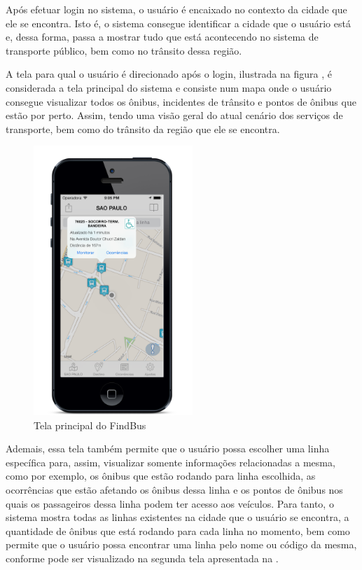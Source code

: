 Após efetuar login no sistema, o usuário é encaixado no contexto da cidade que ele se encontra. Isto é, o sistema consegue identificar a cidade que o usuário está e, dessa forma,  passa a mostrar tudo que está acontecendo no sistema de transporte público, bem como no trânsito dessa região. 
	
A tela para qual o usuário é direcionado após o login, ilustrada na figura , é considerada a tela principal do sistema e consiste num mapa onde o usuário consegue visualizar todos os ônibus, incidentes de trânsito e pontos de ônibus que estão por perto. Assim, tendo uma visão geral do atual cenário dos serviços de transporte, bem como do trânsito da região que ele se encontra.  

\begin{figure}[htp]
\begin{center}
  \includegraphics[width=6cm]{images/telas/pertoDeVoce.png}
  \caption{Tela principal do FindBus}
  \label{fig:telaPrertoDeVoce}
\end{center}
\end{figure}

	
Ademais, essa tela também permite que o usuário possa escolher uma linha específica para, assim, visualizar somente informações relacionadas a mesma, como por exemplo, os ônibus que estão rodando para linha escolhida, as ocorrências que estão afetando os ônibus dessa linha e os pontos de ônibus nos quais os passageiros dessa linha podem ter acesso aos veículos. Para tanto, o sistema mostra todas as linhas existentes na cidade que o usuário se encontra, a quantidade de ônibus que está rodando para cada linha no momento, bem como permite que o usuário possa encontrar uma linha pelo nome ou código da mesma, conforme pode ser visualizado na segunda tela apresentada na .
	
